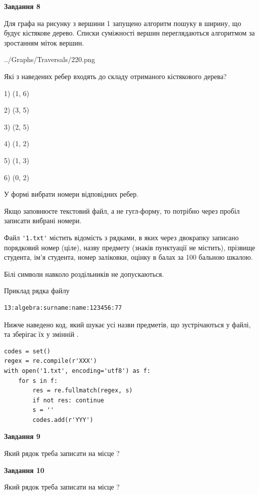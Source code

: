 \documentclass[12pt, ukrainian]{article}
\def\code#1{\Verb!#1!}
\begin{document}
{\begin {large}
{\begin {center}\textbf{Завдання 8}\end {center}}\par
Для графа на рисунку з вершини 1 запущено алгоритм пошуку в ширину, що будує кістякове дерево. Списки суміжності вершин переглядаються алгоритмом за зростанням міток вершин.\par
\begin{center}
	{../Graphs/Traversals/220.png}
\end{center}
\par Які з наведених ребер входять до складу отриманого кістякового дерева?\par
1) (1, 6)\par
2) (3, 5)\par
3) (2, 5)\par
4) (1, 2)\par
5) (1, 3)\par
6) (0, 2)\par
{\vskip 15pt} У формі вибрати номери відповідних ребер.


Якщо заповнюєте текстовий файл, а не гугл-форму, то потрібно через пробіл записа\-ти вибрані номери.\par
\newpage


Файл \code{'1.txt'} містить відомість з рядками, в яких через двокрапку записано поряд\-ковий номер (ціле), назву предмету (знаків пунктуації не містить), прізвище студента, ім'я студента, номер заліковки, оцінку в балах за 100 бальною шкалою.

Білі символи навколо роздільників не допускаються.

Приклад рядка файлу



\begin{verbatim}
13:algebra:surname:name:123456:77
\end{verbatim}


Нижче наведено код, який шукає усі назви предметів, що зустрічаються у файлі, та зберігає їх у змінній .



\begin{verbatim}
codes = set()
regex = re.compile(r'XXX')
with open('1.txt', encoding='utf8') as f:
    for s in f:
        res = re.fullmatch(regex, s)
        if not res: continue
        s = ''
        codes.add(r'YYY')
\end{verbatim}


{\begin {center}\textbf{Завдання 9}\end {center}}\par
Який рядок треба записати на місце  ?\par
\vspace{5mm}


{\begin {center}\textbf{Завдання 10}\end {center}}\par
Який рядок треба записати на місце  ?\par


\newpage


\end {large}}
\end{document}
